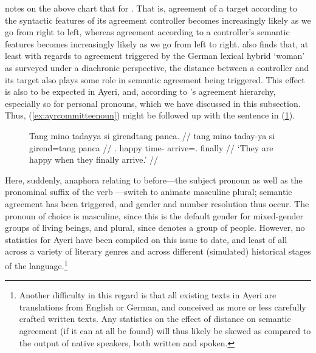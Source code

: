 \citet{corbett2006} notes on the above chart that for . That is, agreement of a target according to the
syntactic features of its agreement controller becomes increasingly likely
as we go from right to left, whereas agreement according to a controller's
semantic features becomes increasingly likely as we go from left to right.
\citet{fleischer2012} also finds that, at least with regards to agreement
triggered by the German lexical hybrid  `woman' as surveyed under a
diachronic perspective, the distance between a controller and its target
also plays some role in semantic agreement being triggered. This effect is also
to be expected in Ayeri, and, according to \citet{corbett2006}'s agreement
hierarchy, especially so for personal pronouns, which we have discussed in this
subsection. Thus, (\ref{ex:ayrcommitteenoun}) might be followed up with the
sentence in (\ref{ex:ayrcommitteenoun_2}).

\begin{figure}[h]
\ex\label{ex:ayrcommitteenoun_2}\begingl
	\gla Tang mino tadayya si girendtang panca. //
	\glb tang mino taday-ya si girend=tang panca //
	\glc \TplM{}.\Aarg{} happy time-\Loc{} \Rel{} arrive=\TplM{}.\Aarg{} 
		finally //
	\glft `They are happy when they finally arrive.' //
\endgl\xe
\end{figure}

Here, suddenly, anaphora relating to  before---the
subject pronoun  as well as the pronominal suffix of the
verb ---switch to animate masculine
plural; semantic agreement has been triggered, and gender and number resolution
thus occur. The pronoun of choice is masculine, since this is the default
gender for mixed-gender groups of living beings, and plural, since
 denotes a group of people. However, no statistics for
Ayeri have been compiled on this issue to date, and least of all across a
variety of literary genres and across different (simulated) historical stages
of the language.\footnote{Another difficulty in this regard is that all
existing texts in Ayeri are translations from English or German, and conceived
as more or less carefully crafted written texts. Any statistics on the effect
of distance on semantic agreement (if it can at all be found) will thus likely
be skewed as compared to the output of native speakers, both written and
spoken.}

